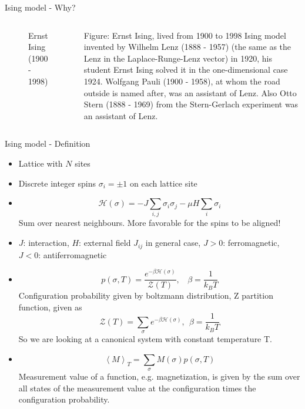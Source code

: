 \documentclass[handout]{beamer}
\begin{document}
\begin{frame}{Ising model - Why?}
\begin{columns}[c]
\begin{figure}[p]
		\caption{Ernst Ising (1900 - 1998)}
		\label{fig:awesome_image}
	\end{figure}
	 {Figure: Ernst Ising, lived from 1900 to 1998}
	 {Ising model invented by Wilhelm Lenz (1888 - 1957) (the same as the Lenz in the Laplace-Runge-Lenz vector) in 1920, his student Ernst Ising solved it in the one-dimensional case 1924.}
	 {Wolfgang Pauli (1900 - 1958), at whom the road outside is named after, was an assistant of Lenz.}
	 {Also Otto Stern (1888 - 1969) from the Stern-Gerlach experiment was an assistant of Lenz.}
\end{columns}
\end{frame}

\begin{frame}{Ising model - Definition}
\begin{itemize}
\item<2-> Lattice with \(N\) sites
\item<3-> Discrete integer spins \( \sigma_i = \pm 1 \) on each lattice site
\item<4-> \[ \mathscr{H}(\sigma) = -J \sum\limits_{i, j} \sigma_i \sigma_j - \mu H \sum\limits_i \sigma_i \]
	 {Sum over nearest neighbours.}
	 {More favorable for the spins to be aligned!}
\item<5-> \( J \): interaction, \( H \): external field
	 {\( J_{ij} \) in general case, \( J>0 \): ferromagnetic, \( J<0 \): antiferromagnetic}
\item<6-> \[ p(\sigma, T) = \frac{e^{-\beta \mathscr{H}(\sigma)}}{\mathscr{Z}(T)}, \ \ \ \ \beta=\frac{1}{k_B T}\]
	 {Configuration probability given by boltzmann distribution, Z partition function, given as \[ \mathscr{Z}(T) = \sum_\sigma e^{-\beta \mathscr{H}(\sigma)},\ \ \beta = \frac{1}{k_B T} \]}
	 {So we are looking at a canonical system with constant temperature T.}
\item<7-> \[ \left< M \right>_T = \sum_\sigma M(\sigma)p(\sigma,T) \]
	 {Measurement value of a function, e.g. magnetization, is given by the sum over all states of the measurement value at the configuration times the configuration probability.}
\end{itemize}
\end{frame}
\end{document}
